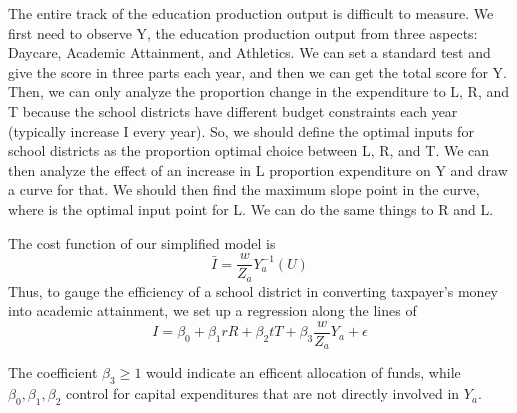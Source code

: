 \documentclass{homework}
\begin{document}
The entire track of the education production output is difficult to measure. We first need to observe Y, the education production output from three aspects: Daycare, Academic Attainment, and Athletics. We can set a standard test and give the score in three parts each year, and then we can get the total score for Y. Then, we can only analyze the proportion change in the expenditure to L, R, and T because the school districts have different budget constraints each year (typically increase I every year). So, we should define the optimal inputs for school districts as the proportion optimal choice between L, R, and T. We can then analyze the effect of an increase in L proportion expenditure on Y and draw a curve for that. We should then find the maximum slope point in the curve, where is the optimal input point for L. We can do the same things to R and L.

The cost function of our simplified model is \[\bar{I} = \frac{w}{Z_a} Y_a^{-1}(U)\]
Thus, to gauge the efficiency of a school district in converting taxpayer's money into academic attainment, we set up a regression along the lines of
\[I = \beta_0 + \beta_1 rR + \beta_2 tT + \beta_3 \frac{w}{Z_a} Y_a + \epsilon \]

The coefficient $\beta_3 \geq 1$ would indicate an efficent allocation of funds, while $\beta_0,\beta_1,\beta_2$ control for capital expenditures that are not directly involved in $Y_a$.



\end{document}
